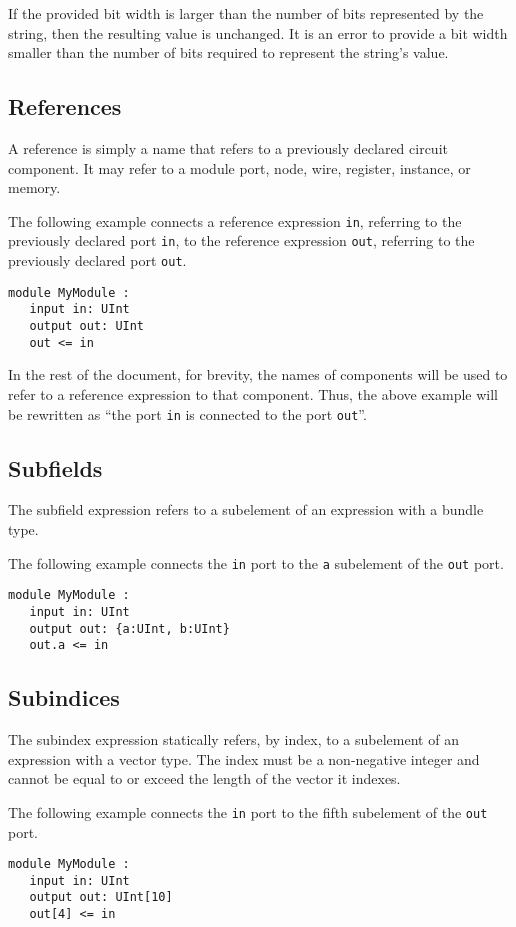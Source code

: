 \documentclass[12pt]{article}
\begin{document}
If the provided bit width is larger than the number of bits represented by the string, then the resulting value is unchanged.
It is an error to provide a bit width smaller than the number of bits required to represent the string's value.

\subsection{References}
A reference is simply a name that refers to a previously declared circuit component. It may refer to a module port, node, wire, register, instance, or memory.

The following example connects a reference expression \verb|in|, referring to the previously declared port \verb|in|, to the reference expression \verb|out|, referring to the previously declared port \verb|out|.

\begin{lstlisting}
module MyModule :
   input in: UInt
   output out: UInt
   out <= in
\end{lstlisting}

In the rest of the document, for brevity, the names of components will be used to refer to a reference expression to that component. Thus, the above example will be rewritten as ``the port \verb|in| is connected to the port \verb|out|''.

\subsection{Subfields}\label{subfields}
The subfield expression refers to a subelement of an expression with a bundle type.

The following example connects the \verb|in| port to the \verb|a| subelement of the \verb|out| port. 
\begin{lstlisting}
module MyModule :
   input in: UInt
   output out: {a:UInt, b:UInt}
   out.a <= in
\end{lstlisting}

\subsection{Subindices}\label{subindices}
The subindex expression statically refers, by index, to a subelement of an expression with a vector type. The index must be a non-negative integer and cannot be equal to or exceed the length of the vector it indexes.

The following example connects the \verb|in| port to the fifth subelement of the \verb|out| port. 
\begin{lstlisting}
module MyModule :
   input in: UInt
   output out: UInt[10]
   out[4] <= in
\end{lstlisting}
\end{document}
